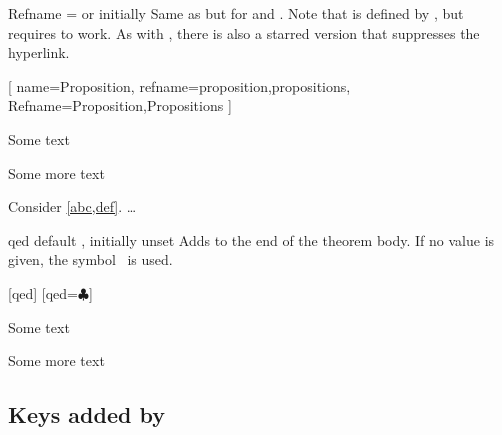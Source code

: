 \documentclass{ltxdoc}
\begin{document}
\begin{docKey}{Refname}
  {= \textrm{or} }
  {initially }
Same as  but for  and .
Note that  is defined by , but requires  to work.
As with , there is also a starred version  that suppresses the hyperlink.

\begin{tcbwritetemp}
[
  name=Proposition,
  refname={proposition,propositions},
  Refname={Proposition,Propositions}
  ]
\end{tcbwritetemp}

\begin{keythmscode}[withpreamble]
\begin{prop}[label=abc]
Some text
\end{prop}
\begin{prop}[label=def]
Some more text
\end{prop}
\begin{theorem}
Consider \cref{abc,def}.
 \dots
\end{theorem}
\end{keythmscode}

\end{docKey}

\begin{docKey}{qed}
  {}
  {default , initially unset}
Adds  to the end of the theorem body.
If no value is given, the symbol \openbox\ is used.

\begin{tcbwritetemp}
[qed]
[qed=$\clubsuit$]
\end{tcbwritetemp}

\begin{keythmscode}[withpreamble]
\begin{example}
Some text
\end{example}
\begin{solution}
Some more text
\end{solution}
\end{keythmscode}

\end{docKey}

\subsection{Keys added by } \label{thm-added-keys}
\end{document}

